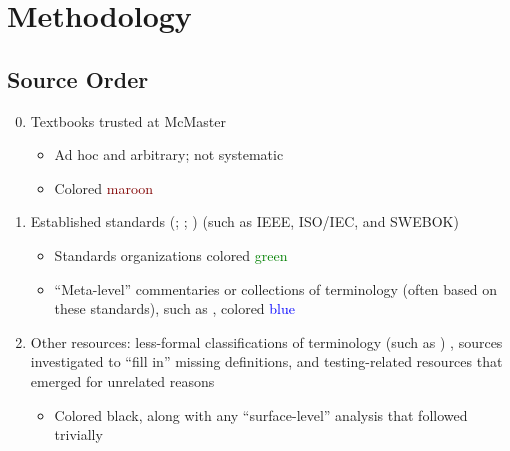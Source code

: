 \section{Methodology}
\label{method}

\subsection{Source Order}
\begin{enumerate}
      \setcounter{enumi}{-1}
      \item Textbooks trusted at McMaster
            \citep{Patton2006, PetersAndPedrycz2000, vanVliet2000}
            \begin{itemize}
                  \item Ad hoc and arbitrary; not systematic
                  \item Colored \textcolor{Maroon}{maroon}
            \end{itemize}
      \item Established standards
            \ifnotpaper
                  (\citealp{IEEE2022, SWEBOK2024, SWEBOK2014, IEEE2017, IEEE2013,
                        ISO_IEC2023b, IEEE2012, ISO_IEC2023a}; \citealpISTQB{};
                  \citealp{IEEE2021})
            \else
                  (such as IEEE, ISO/IEC, and SWEBOK)
                  \citep{IEEE2022, SWEBOK2024, SWEBOK2014, IEEE2017, IEEE2013,
                        ISO_IEC2023b, IEEE2012, ISO_IEC2023a, ISTQB, IEEE2021}
            \fi
            \begin{itemize}
                  \item Standards organizations colored \textcolor{green}{green}
                  \item ``Meta-level'' commentaries or collections of
                        terminology (often based on these standards), such as
                        \citep{Firesmith2015}, colored \textcolor{blue}{blue}
            \end{itemize}
      \item Other resources: less-formal classifications of terminology
            \ifnotpaper
                  \citep[e.g.,][]{KuļešovsEtAl2013}%
            \else
                  (such as \citep{KuļešovsEtAl2013})%
            \fi%
            , sources investigated to
            ``fill in'' missing definitions,
            and testing-related resources that emerged for unrelated reasons
            \begin{itemize}
                  \item Colored black, along with any ``surface-level''
                        analysis that followed trivially
            \end{itemize}
\end{enumerate}

